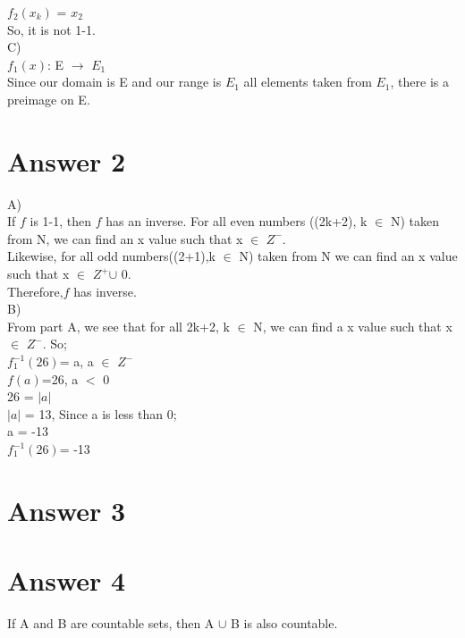 \documentclass[12pt]{article}
\begin{document}
$f_2$$(x_k)$ = $x_2$\\

So, it is not 1-1.\\
C)\\

$f_1$$(x)$: E $\rightarrow$ $E_1$\\

Since our domain is E and our range is $E_1$ all elements taken from $E_1$, there is a preimage on E.
\section*{Answer 2}
A)\\

If $f$ is 1-1, then $f$ has an inverse. For all even numbers ((2k+2), k $\in$ N) taken from N, we can find an x value such that  x $\in$ $Z^{-}$.\\

Likewise, for all odd numbers((2+1),k $\in$ N) taken from N we can find an x value such that x $\in$ $Z^{+}$$\cup$ 0.\\

Therefore,$f$ has inverse.\\
B)\\

From part A, we see that for all 2k+2,  k $\in$ N, we can find a x value such that  x$\in$ $Z^{-}$. So;\\

$f_1^{-1}(26)$= a,  a $\in$ $Z^{-}$\\

$f(a)$=26,  a $<$ 0\\

26 = $|a|$\\

$|a|$ = 13, Since a is less than 0;\\

a = -13\\

$f_1^{-1}(26)$= -13

\section*{Answer 3}


\section*{Answer 4}
If A and B are countable sets, then A $\cup$ B is also countable.
\end{document}
